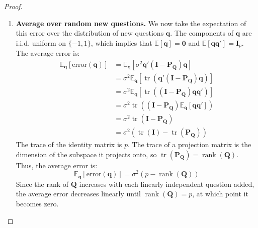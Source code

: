 \documentclass[\ifdraft draft\fi]{article}
\begin{document}
\begin{greyproof}
\begin{proof}
\begin{enumerate}
    \item  \textbf{Average over random new questions.} We now take the expectation of this error over the distribution of new questions $\bm q$. The components of $\bm q$ are i.i.d. uniform on $\{-1,1\}$, which implies that $\mathbb{E}[\bm q] = \bm 0$ and $\mathbb{E}[\bm q \bm q'] = \bm{I}_p$. The average error is:
    \[\begin{aligned}
       \mathbb{E}_{\bm q}[\text{error}(\bm q)] &= \mathbb{E}_{\bm q}[\sigma^2 \bm q'(\bm{I}-\bm{P_Q})\bm q] \\
                                              &= \sigma^2 \mathbb{E}_{\bm q}[\operatorname{tr}(\bm q'(\bm{I}-\bm{P_Q})\bm q)] \\
                                              &= \sigma^2 \mathbb{E}_{\bm q}[\operatorname{tr}((\bm{I}-\bm{P_Q})\bm q \bm q')] \\
                                              &= \sigma^2 \operatorname{tr}((\bm{I}-\bm{P_Q})\mathbb{E}_{\bm q}[\bm q \bm q']) \\
                                              &= \sigma^2 \operatorname{tr}(\bm{I}-\bm{P_Q}) \\
                                              &= \sigma^2 (\operatorname{tr}(\bm{I}) - \operatorname{tr}(\bm{P_Q}))
    \end{aligned}\]
    The trace of the identity matrix is $p$. The trace of a projection matrix is the dimension of the subspace it projects onto, so $\operatorname{tr}(\bm{P_Q}) = \operatorname{rank}(\bm{Q})$. Thus, the average error is:
    \[
       \mathbb{E}_{\bm q}[\text{error}(\bm q)] = \sigma^2 (p - \operatorname{rank}(\bm{Q}))
    \]
    Since the rank of $\bm{Q}$ increases with each linearly independent question added, the average error decreases linearly until $\operatorname{rank}(\bm{Q})=p$, at which point it becomes zero.
\end{enumerate}
\end{proof}
\end{greyproof}
\end{document}
